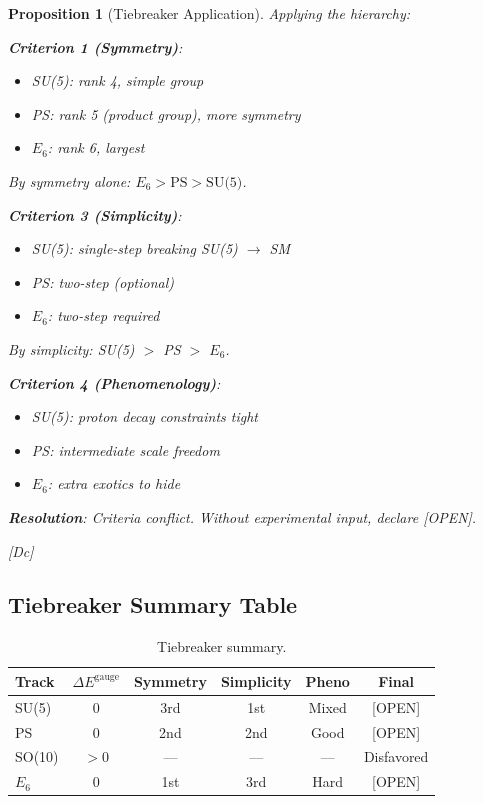 \documentclass[11pt,a4paper]{article}
\newtheorem{proposition}[theorem]{Proposition}
\newcommand{\tagDc}{\textcolor{blue!50!black}{[Dc]}}
\newcommand{\tagOPEN}{\textcolor{red!70!black}{[OPEN]}}
\begin{document}
\begin{proposition}[Tiebreaker Application]
\label{prop:tiebreaker}
Applying the hierarchy:

\textbf{Criterion 1 (Symmetry)}:
\begin{itemize}
    \item SU(5): rank 4, simple group
    \item PS: rank 5 (product group), more symmetry
    \item $E_6$: rank 6, largest
\end{itemize}
By symmetry alone: $E_6 > \text{PS} > \text{SU(5)}$.

\textbf{Criterion 3 (Simplicity)}:
\begin{itemize}
    \item SU(5): single-step breaking SU(5) $\to$ SM
    \item PS: two-step (optional)
    \item $E_6$: two-step required
\end{itemize}
By simplicity: SU(5) $>$ PS $>$ $E_6$.

\textbf{Criterion 4 (Phenomenology)}:
\begin{itemize}
    \item SU(5): proton decay constraints tight
    \item PS: intermediate scale freedom
    \item $E_6$: extra exotics to hide
\end{itemize}

\textbf{Resolution}: Criteria conflict. Without experimental input, declare \tagOPEN.

\tagDc
\end{proposition}

\subsection{Tiebreaker Summary Table}

\begin{table}[h]
\centering
\begin{tabular}{lccccc}
\toprule
Track & $\Delta E^{\text{gauge}}$ & Symmetry & Simplicity & Pheno & Final \\
\midrule
SU(5) & 0 & 3rd & 1st & Mixed & \tagOPEN \\
PS & 0 & 2nd & 2nd & Good & \tagOPEN \\
SO(10) & $>0$ & --- & --- & --- & Disfavored \\
$E_6$ & 0 & 1st & 3rd & Hard & \tagOPEN \\
\bottomrule
\end{tabular}
\caption{Tiebreaker summary.}
\label{tab:tiebreaker}
\end{table}
\end{document}
